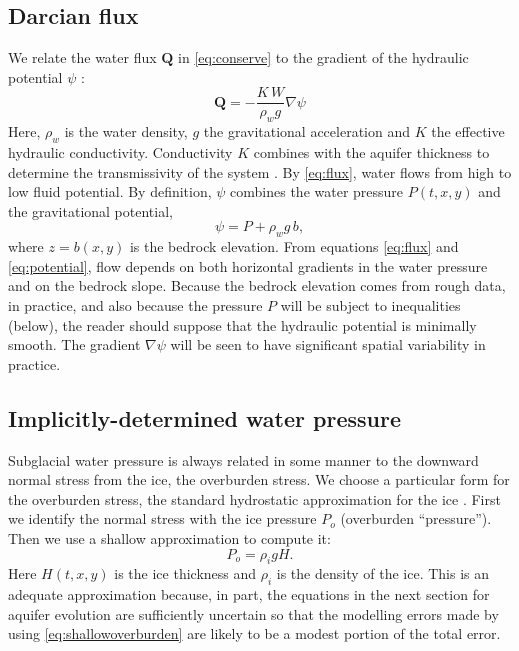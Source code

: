 \documentclass[11pt]{amsart}
\newcommand{\bQ}{\mathbf{Q}}
\begin{document}
\subsection*{Darcian flux}  We relate the water flux $\bQ$ in \eqref{eq:conserve} to the gradient of the hydraulic potential $\psi$ \citep{Clarke05, FlowersClarke2002_theory}:
\begin{equation}
\bQ = - \frac{K \, W}{\rho_w g} \nabla \psi
\label{eq:flux}
\end{equation}
Here, $\rho_w$ is the water density, $g$ the gravitational acceleration and $K$ the effective hydraulic conductivity.  Conductivity $K$ combines with the aquifer thickness to determine the transmissivity of the system \citep{PimentelFlowersSchoof2010}.  By \eqref{eq:flux}, water flows from high to low fluid potential.  By definition, $\psi$ combines the water pressure $P(t,x,y)$ and the gravitational potential,
\begin{equation} \label{eq:potential}
\psi = P + \rho_w g\, b,
\end{equation}
where $z=b(x,y)$ is the bedrock elevation.  From equations \eqref{eq:flux} and \eqref{eq:potential}, flow depends on both horizontal gradients in the water pressure and on the bedrock slope.  Because the bedrock elevation comes from rough data, in practice, and also because the pressure $P$ will be subject to inequalities (below), the reader should suppose that the hydraulic potential is minimally smooth.  The gradient $\nabla \psi$ will be seen to have significant spatial variability in practice.


\subsection*{Implicitly-determined water pressure}  Subglacial water pressure is always related in some manner to the downward normal stress from the ice, the overburden stress.  We choose a particular form for the overburden stress, the standard hydrostatic approximation for the ice \citep{Clarke05}.  First we identify the normal stress with the ice pressure $P_o$ (overburden ``pressure'').  Then we use a shallow approximation \citep{Fowler} to compute it:
\begin{equation}\label{eq:shallowoverburden}
  P_o = \rho_i g H.
\end{equation}
Here $H(t,x,y)$ is the ice thickness and $\rho_i$ is the density of the ice.   This is an adequate approximation because, in part, the equations in the next section for aquifer evolution are sufficiently uncertain so that the modelling errors made by using \eqref{eq:shallowoverburden} are likely to be a modest portion of the total error.
\end{document}
